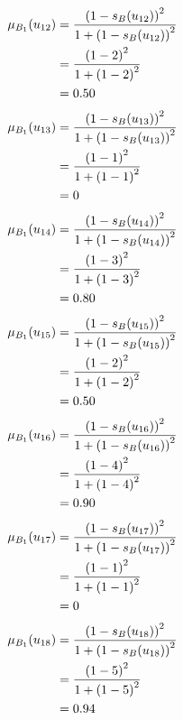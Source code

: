 \documentclass[a4paper]{book}
\begin{document}
				\begin{align}
					\mu_{B_1}(u_{12}) &= \frac{\left(1-s_B(u_{12})\right)^2}{1 + \left(1-s_B(u_{12})\right)^2}\\
					&= \frac{\left(1-2\right)^2}{1 + \left(1-2\right)^2} \notag \\
					&= 0.50 \notag
				\end{align}
				\begin{align}
					\mu_{B_1}(u_{13}) &= \frac{\left(1-s_B(u_{13})\right)^2}{1 + \left(1-s_B(u_{13})\right)^2}\\
					&= \frac{\left(1-1\right)^2}{1 + \left(1-1\right)^2} \notag \\
					&= 0 \notag
				\end{align}
				\begin{align}
					\mu_{B_1}(u_{14}) &= \frac{\left(1-s_B(u_{14})\right)^2}{1 + \left(1-s_B(u_{14})\right)^2}\\
					&= \frac{\left(1-3\right)^2}{1 + \left(1-3\right)^2} \notag \\
					&= 0.80 \notag
				\end{align}
				\begin{align}
					\mu_{B_1}(u_{15}) &= \frac{\left(1-s_B(u_{15})\right)^2}{1 + \left(1-s_B(u_{15})\right)^2}\\
					&= \frac{\left(1-2\right)^2}{1 + \left(1-2\right)^2} \notag \\
					&= 0.50 \notag
				\end{align}
				\begin{align}
					\mu_{B_1}(u_{16}) &= \frac{\left(1-s_B(u_{16})\right)^2}{1 + \left(1-s_B(u_{16})\right)^2}\\
					&= \frac{\left(1-4\right)^2}{1 + \left(1-4\right)^2} \notag \\
					&= 0.90 \notag
				\end{align}
				\begin{align}
					\mu_{B_1}(u_{17}) &= \frac{\left(1-s_B(u_{17})\right)^2}{1 + \left(1-s_B(u_{17})\right)^2}\\
					&= \frac{\left(1-1\right)^2}{1 + \left(1-1\right)^2} \notag \\
					&= 0 \notag
				\end{align}
				\begin{align}
					\mu_{B_1}(u_{18}) &= \frac{\left(1-s_B(u_{18})\right)^2}{1 + \left(1-s_B(u_{18})\right)^2}\\
					&= \frac{\left(1-5\right)^2}{1 + \left(1-5\right)^2} \notag \\
					&= 0.94 \notag
				\end{align}
\end{document}
